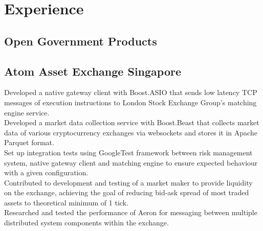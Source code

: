 \documentclass[a4paper,hidelinks]{resume} %
\begin{document}
\begin{minipage}[t]{0.50\textwidth} %

    
    \section{Experience}
    
    \sectionspace %

    \subsection{Open Government Products}
    
    \sectionspace %
    
    \subsection{Atom Asset Exchange Singapore}
    
    \textbullet{} Developed a native gateway client with Boost.ASIO that sends low latency TCP messages of execution instructions to London Stock Exchange Group’s matching engine service. \\
    \textbullet{} Developed a market data collection service with Boost.Beast that collects market data of various cryptocurrency exchanges via websockets and stores it in Apache Parquet format. \\
    \textbullet{} Set up integration tests using GoogleTest framework between risk management system, native gateway client and matching engine to ensure expected behaviour with a given configuration. \\
    \textbullet{} Contributed to development and testing of a market maker to provide liquidity on the exchange, achieving the goal of reducing bid-ask spread of most traded assets to theoretical minimum of 1 tick.\\
    \textbullet{} Researched and tested the performance of Aeron for messaging between multiple distributed system components within the exchange. \\
    

\end{minipage}
\end{document}
